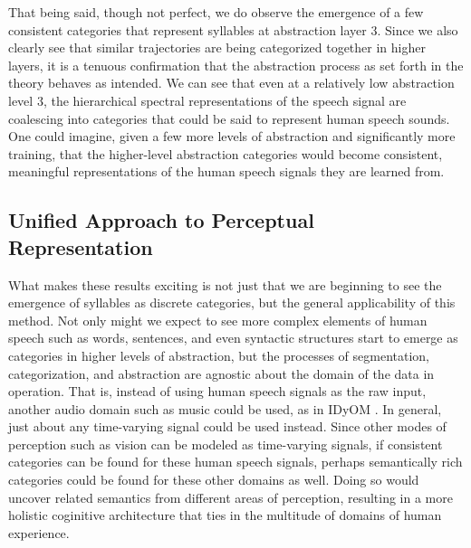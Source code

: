 That being said, though not perfect, we do observe the emergence of a few consistent categories that represent syllables at abstraction layer 3.  Since we also clearly see that similar trajectories are being categorized together in higher layers, it is a tenuous confirmation that the abstraction process as set forth in the theory behaves as intended.  We can see that even at a relatively low abstraction level 3, the hierarchical spectral representations of the speech signal are coalescing into categories that could be said to represent human speech sounds.  One could imagine, given a few more levels of abstraction and significantly more training, that the higher-level abstraction categories would become consistent, meaningful representations of the human speech signals they are learned from.

\subsection{Unified Approach to Perceptual Representation}
\label{section:unified-approach-to-perceptual-representation}

What makes these results exciting is not just that we are beginning to see the emergence of syllables as discrete categories, but the general applicability of this method.  Not only might we expect to see more complex elements of human speech such as words, sentences, and even syntactic structures \citep{chomsky2002syntactic} start to emerge as categories in higher levels of abstraction, but the processes of segmentation, categorization, and abstraction are agnostic about the domain of the data in operation. That is, instead of using human speech signals as the raw input, another audio domain such as music could be used, as in IDyOM \citep{pearce2005construction}.  In general, just about any time-varying signal could be used instead.  Since other modes of perception such as vision can be modeled as time-varying signals, if consistent categories can be found for these human speech signals, perhaps semantically rich categories could be found for these other domains as well.  Doing so would uncover related semantics from different areas of perception, resulting in a more holistic coginitive architecture that ties in the multitude of domains of human experience.
